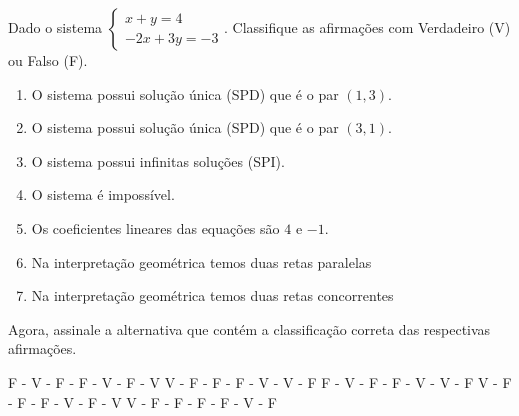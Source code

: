 Dado o sistema $\left\{ \begin{array}{l}
x+y=4\\
-2x+3y=-3
\end{array} \right.$. Classifique as afirmações com Verdadeiro (V) ou Falso (F).
\begin{enumerate}[(\quad)]
\item O sistema possui solução única (SPD) que é o par $(1,3)$.
\item O sistema possui solução única (SPD) que é o par $(3,1)$.
\item O sistema possui infinitas soluções (SPI).
\item O sistema é impossível.
\item Os coeficientes lineares das equações são $4$ e $-1$.
\item Na interpretação geométrica temos duas retas paralelas
\item Na interpretação geométrica temos duas retas concorrentes
\end{enumerate}
Agora, assinale a alternativa que contém a classificação correta das respectivas afirmações.

F - V - F - F - V - F - V
V - F - F - F - V - V - F
F - V - F - F - V - V - F
V - F - F - F - V - F - V
V - F - F - F - F - V - F


